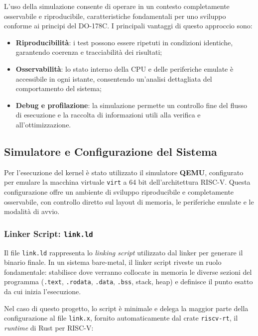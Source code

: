 \documentclass[italian, Lau, oneside]{sapthesis} %
\begin{document}
L’uso della simulazione consente di operare in un contesto completamente osservabile e riproducibile, caratteristiche fondamentali per uno sviluppo conforme ai principi del DO-178C.  
I principali vantaggi di questo approccio sono:
\begin{itemize}
    \item \textbf{Riproducibilità}: i test possono essere ripetuti in condizioni identiche, garantendo coerenza e tracciabilità dei risultati;
    \item \textbf{Osservabilità}: lo stato interno della CPU e delle periferiche emulate è accessibile in ogni istante, consentendo un’analisi dettagliata del comportamento del sistema;
    \item \textbf{Debug e profilazione}: la simulazione permette un controllo fine del flusso di esecuzione e la raccolta di informazioni utili alla verifica e all’ottimizzazione.
\end{itemize}

\subsection{Simulatore e Configurazione del Sistema}

Per l’esecuzione del kernel è stato utilizzato il simulatore \textbf{QEMU}, configurato per emulare la macchina virtuale \texttt{virt} a 64 bit dell’architettura RISC-V.  
Questa configurazione offre un ambiente di sviluppo riproducibile e completamente osservabile, con controllo diretto sul layout di memoria, le periferiche emulate e le modalità di avvio.

\subsubsection*{Linker Script: \texttt{link.ld}}

Il file \texttt{link.ld} rappresenta lo \emph{linking script} utilizzato dal linker per generare il binario finale.  
In un sistema bare-metal, il linker script riveste un ruolo fondamentale: stabilisce dove verranno collocate in memoria le diverse sezioni del programma (\texttt{.text}, \texttt{.rodata}, \texttt{.data}, \texttt{.bss}, stack, heap) e definisce il punto esatto da cui inizia l’esecuzione.

Nel caso di questo progetto, lo script è minimale e delega la maggior parte della configurazione al file \texttt{link.x}, fornito automaticamente dal crate \texttt{riscv-rt}, il \emph{runtime} di Rust per RISC-V:
\end{document}
